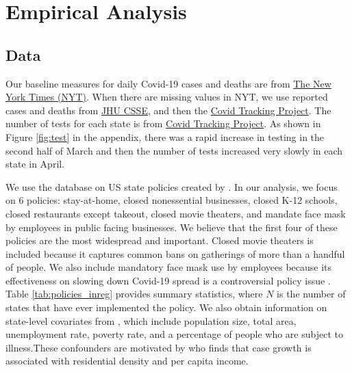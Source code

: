 \documentclass[11pt,reqno,letter]{amsart}
\theoremstyle{definition}
\begin{document}
\section{Empirical Analysis}
\subsection{Data}

Our baseline measures for daily Covid-19   cases and deaths are from
\href{https://github.com/nytimes/covid-19-data}{The New York Times (NYT)}. When there are missing values in NYT, we use reported cases and deaths from \href{https://github.com/CSSEGISandData/COVID-19}{JHU CSSE}, and then the
\href{https://github.com/COVID19Tracking/covid-tracking-data}{Covid
Tracking Project}.  The number of tests for each state is from  \href{https://github.com/COVID19Tracking/covid-tracking-data}{Covid
 Tracking Project}. As shown in Figure \ref{fig:test} in the appendix, there was a rapid increase in testing in the second half of March and then the
number of tests increased very slowly in each state in April.

We use the database on US state policies created by
\cite{raifman2020}.
In our analysis, we focus on 6
policies:  stay-at-home, closed nonessential
businesses, closed K-12 schools, closed restaurants except takeout, closed movie theaters, and mandate face mask by  employees in public facing businesses.
We believe that the first four of these
policies are the most widespread and important.
Closed movie theaters is included because it captures common bans on gatherings of more than
a handful of people. We also include mandatory face mask use by employees because its effectiveness on slowing down Covid-19 spread is a controversial policy issue \citep{howard2020,Greenhalghm2020,zhangr2020}.
Table \ref{tab:policies_inreg} provides summary statistics, where $N$ is the number of states that have ever implemented the policy. We also obtain information on state-level covariates from \citet{raifman2020}, which include population size, total area, unemployment rate, poverty rate, and a percentage of people who are subject to illness.These confounders are motivated by \cite{wheaton2020} who finds that case growth is associated  with residential density and per capita income.



\end{document}
